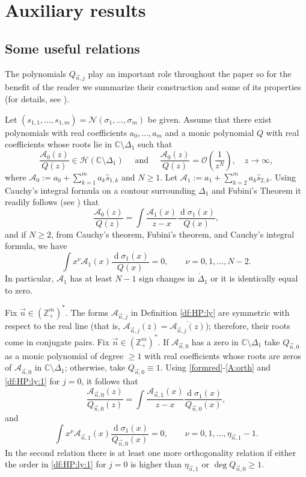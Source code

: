 \documentclass{amsart}
\numberwithin{equation}{section}
\theoremstyle{definition}
\DeclareMathOperator{\D}{d}        %
\newcommand{\ZZ}{\mathbb{Z}}      %
\newcommand{\CC}{\mathbb{C}}      %
\newcommand{\n}{\vec{n}}          %
\begin{document}
\section{Auxiliary results}

\subsection{Some useful relations} \label{2.1} The polynomials $Q_{\n,j}$ play an important role throughout the paper so for the benefit of the reader we summarize their construction and some of its properties (for details, see \cite[Lemmas 2.1, 2.2, and 3.1]{SLL22}).

Let $(s_{1,1},\ldots,s_{1,m}) =\mathcal{N}(\sigma_1,\ldots,\sigma_m)$ be given. Assume that there exist polynomials with real coefficients $a_0,\ldots, a_m$ and a monic polynomial $Q$ with real coefficients whose roots lie in $\CC \setminus\Delta_1$ such that
\begin{equation*}
    \frac{\mathcal{A}_0(z)}{Q(z)}\in\mathcal{H}(\CC \setminus\Delta_1) \quad \textrm{ and }\quad \frac{\mathcal{A}_0(z)}{Q(z)}=\mathcal{O}\left(\frac{1}{z^N}\right),\quad z\rightarrow \infty,
\end{equation*}
where $\displaystyle \mathcal{A}_0:= a_0 +\sum_{k=1}^m a_k\widehat{s}_{1,k}$ and $N\geq 1$. Let $\displaystyle \mathcal{A}_1:= a_1 + \sum_{k=2}^m a_k\widehat{s}_{2,k}$. Using Cauchy's integral formula on a contour surrounding $\Delta_1$ and Fubini's Theorem it readily follows (see \cite[Lemma 2.1]{SLL22}) that
\begin{equation} \label{formred}
    \frac{\mathcal{A}_0(z)}{Q(z)} = \int \frac{\mathcal{A}_1(x)}{z-x}\frac{\D \sigma_1(x)}{Q(x)},
\end{equation}
and if $N\geq 2$, from Cauchy's theorem, Fubini's theorem, and Cauchy's integral formula, we have
\begin{equation}
    \label{A:orth}
    \int x^\nu \mathcal{A}_1(x)\frac{\D \sigma_1(x)}{Q(x)}=0,\qquad \nu=0,1,\ldots, N-2.
\end{equation}
In particular, $\mathcal{A}_1$ has at least $N-1$ sign changes in $\mathring{\Delta}_1$ or it is identically equal to zero.


Fix $\n \in (\ZZ_+^m)^*$. The forms $\mathcal{A}_{\n,j}$ in Definition \ref{df:HP:ly} are symmetric with
respect to the real line (that is, $\mathcal{A}_{\n,j}(\overline{z}) = \overline{\mathcal{A}_{\n,j}({z})}$); therefore, their roots come in conjugate pairs. Fix $\n \in (\ZZ_+^m)^*$. If $\mathcal{A}_{\n,0}$ has a zero in $\CC \setminus \Delta_1$ take $Q_{\n,0}$ as a monic polynomial of degree $\geq 1$ with real coefficients whose roots are zeros of $\mathcal{A}_{\n,0}$ in $\CC \setminus \Delta_1$; otherwise, take $Q_{\n,0} \equiv 1$. Using \eqref{formred}-\eqref{A:orth} and  \eqref{df:HP:ly:1} for $j=0$, it follows that
\[
  \frac{\mathcal{A}_{\n,0}(z)}{Q_{\n,0}(z)} = \int \frac{\mathcal{A}_{\n,1}(x)}{z-x}\frac{\D \sigma_1(x)}{Q_{\n,0}(x)},
\]
and
\[
  \int x^\nu \mathcal{A}_{\n,1}(x)\frac{\D \sigma_1(x)}{Q_{\n,0}(x)}=0,\qquad \nu=0,1,\ldots, \eta_{\n,1}-1.
\]
In the second relation there is at least one more orthogonality relation if either the order in \eqref{df:HP:ly:1} for $j=0$ is higher than $\eta_{\n,1}$ or $\deg Q_{\n,0} \geq 1$.
\end{document}
